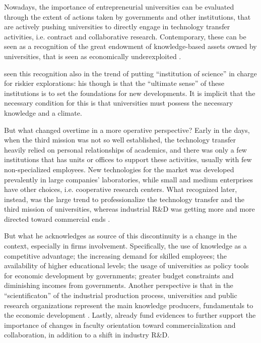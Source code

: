 Nowadays, the importance of entrepreneurial universities can be evaluated through the extent of actions taken by governments and other institutions, that are actively pushing universities to directly engage in technology transfer activities, i.e. contract and collaborative research. Contemporary, these can be seen as a recognition of the great endowment of knowledge-based assets owned by universities, that is seen as economically underexploited \citep{Tijssen2006}. 

\citet{Balconi2006} seen this recognition also in the trend of putting \enquote{institution of science} in charge for riskier explorations: his though is that the \enquote{ultimate sense} of these institutions is to set the foundations for new developments. It is implicit that the necessary condition for this is that universities must possess the necessary knowledge and a climate.

But what changed overtime in a more operative perspective? Early in the days, when the third mission was not so well established, the technology transfer heavily relied on personal relationships of academics, and there was only a few institutions that has units or offices to support these activities, usually with few non-specialized employees. New technologies for the market was developed prevalently in large companies' laboratories, while small and medium enterprises have other choices, i.e. cooperative research centers. What \citet{Geuna2009} recognized later, instead, was the large trend to professionalize the technology transfer and the third mission of universities, whereas industrial R\&D was getting more and more directed toward commercial ends \citep{Fritsch2007}.

But what he acknowledges as source of this discontinuity is a change in the context, especially in firms involvement. Specifically, the use of knowledge as a competitive advantage; the increasing demand for skilled employees; the availability of higher educational levels; the usage of universities as policy tools for economic development by governments; greater budget constraints and diminishing incomes from governments. Another perspective is that in the \enquote{scientificaton} of the industrial production process, universities and public research organizations represent the main knowledge producers, fundamentals to the economic development \citep{Balderi2007}. Lastly, already \citet{Thursby2002} fund evidences to further support the importance of changes in faculty orientation toward commercialization and collaboration, in addition to a shift in industry R\&D.

